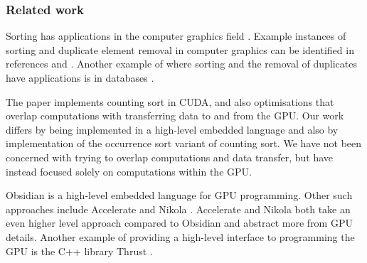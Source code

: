 \subsubsection{Related work} 

Sorting has applications in the computer graphics field \cite{sintorn}. 
Example instances of sorting and duplicate element removal in computer graphics 
can be identified in references \cite{Olsson} and \cite{Karras}. Another example 
of where sorting and the removal of duplicates have applications is 
in databases \cite{REMOVEDUPS}. 


The paper \cite{CSORT} implements counting sort in CUDA, and also optimisations 
that overlap computations with transferring data to and from the GPU.
Our work differs by being implemented in a high-level embedded
language and also by implementation of the occurrence sort variant of counting sort. We have not been concerned with
trying to overlap computations and data transfer, but have instead
focused solely on computations within the GPU.

Obsidian is a high-level embedded language for GPU
programming. Other such approaches include Accelerate
\cite{Acc} and Nikola \cite{NIKOLA}. Accelerate and Nikola both take an even
higher level approach compared to Obsidian and abstract more from GPU
details. Another example of providing a high-level interface to
programming the GPU is the C++ library Thrust \cite{THRUST}.



